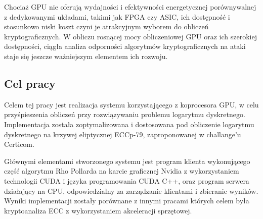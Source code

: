 Chociaż GPU nie oferują wydajności i efektywności energetycznej 
porównywalnej z dedykowanymi układami, takimi jak FPGA czy ASIC, ich dostępność 
i stosunkowo niski koszt czyni je atrakcyjnym wyborem do obliczeń kryptograficznych. 
W obliczu rosnącej mocy obliczeniowej GPU oraz ich szerokiej dostępności, ciągła 
analiza odporności algorytmów kryptograficznych na ataki staje się jeszcze 
ważniejszym elementem ich rozwoju.

\subsection{Cel pracy}
Celem tej pracy jest realizacja systemu korzystającego z koprocesora GPU,
w celu przyśpieszenia obliczeń przy
rozwiązywaniu problemu logarytmu dyskretnego.
Implementacja została zoptymalizowana i dostosowana pod obliczenie logarytmu
dyskretnego na krzywej eliptycznej ECCp-79, zaproponowanej w challange'u Certicom.
\par
Głównymi elementami stworzonego systemu
jest program klienta wykonującego część algorytmu Rho Pollarda na karcie graficznej Nvidia
z wykorzystaniem technologii CUDA i języka programowania CUDA C++,
oraz program serwera działający na CPU, odpowiedzialny za zarządzanie klientami i zbieranie wyników.
 Wyniki implementacji zostały porównane z innymi pracami
których celem była kryptoanaliza ECC z wykorzystaniem akceleracji sprzętowej.
